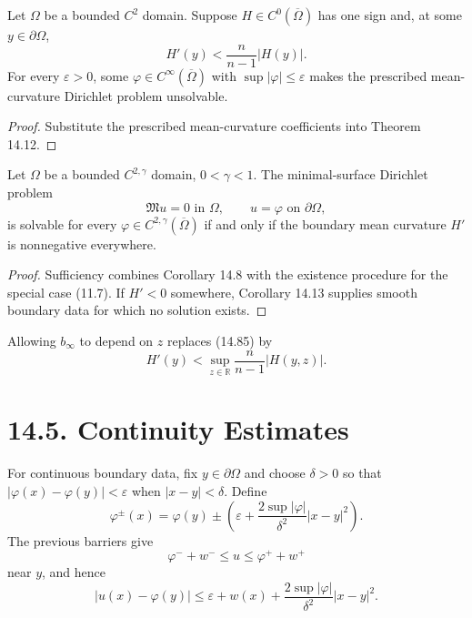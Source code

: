 \begin{corollary}
\label{gt14-boundary-gradient-14-13}
Let $\Omega$ be a bounded $C^2$ domain. Suppose $H\in C^0(\overline\Omega)$
has one sign and, at some $y\in\partial\Omega$,
\begin{equation}
H'(y)<\frac n{n-1}|H(y)|.
\tag{14.85}
\end{equation}
For every $\varepsilon>0$, some
$\varphi\in C^\infty(\overline\Omega)$ with $\sup|\varphi|\leq\varepsilon$
makes the prescribed mean-curvature Dirichlet problem unsolvable.
\end{corollary}
\begin{proof}
\sketch Substitute the prescribed mean-curvature coefficients into Theorem 14.12.
\end{proof}

\begin{theorem}
\label{gt14-boundary-gradient-14-14}
Let $\Omega$ be a bounded $C^{2,\gamma}$ domain, $0<\gamma<1$. The
minimal-surface Dirichlet problem
\[
\mathfrak Mu=0\text{ in }\Omega,\qquad u=\varphi\text{ on }\partial\Omega,
\]
is solvable for every $\varphi\in C^{2,\gamma}(\overline\Omega)$ if and only
if the boundary mean curvature $H'$ is nonnegative everywhere.
\end{theorem}
\begin{proof}
\sketch Sufficiency combines Corollary 14.8 with the existence procedure for
the special case (11.7). If $H'<0$ somewhere, Corollary 14.13 supplies smooth
boundary data for which no solution exists.
\end{proof}

Allowing $b_\infty$ to depend on $z$ replaces (14.85) by
\begin{equation}
H'(y)<\sup_{z\in\mathbb R}\frac n{n-1}|H(y,z)|.
\tag{14.86}
\end{equation}

\section*{14.5. Continuity Estimates}

For continuous boundary data, fix $y\in\partial\Omega$ and choose $\delta>0$ so
that $|\varphi(x)-\varphi(y)|<\varepsilon$ when $|x-y|<\delta$. Define
\begin{equation}
\varphi^\pm(x)=\varphi(y)\pm
\left(\varepsilon+\frac{2\sup|\varphi|}{\delta^2}|x-y|^2\right).
\tag{14.87}
\end{equation}
The previous barriers give
\begin{equation}
\varphi^-+w^-\leq u\leq\varphi^++w^+
\tag{14.88}
\end{equation}
near $y$, and hence
\begin{equation}
|u(x)-\varphi(y)|
\leq\varepsilon+w(x)
+\frac{2\sup|\varphi|}{\delta^2}|x-y|^2.
\tag{14.89}
\end{equation}

